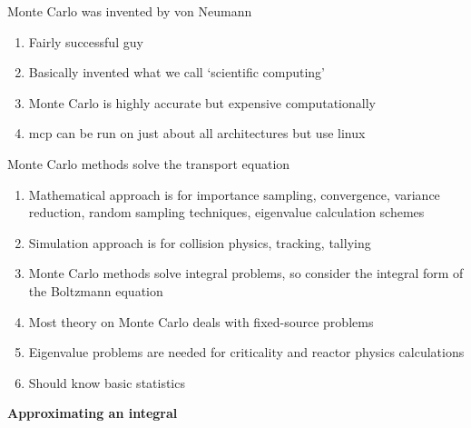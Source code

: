\documentclass[aspectratio=1610,pdftex,dvipsnames,compress,xcolor={dvipsnames}]{beamer}
\newcommand{\acs}{\acrshort} %
\begin{document}
\addtocounter{framenumber}{-1} 
\begin{frame}{Monte Carlo was invented by von Neumann}
    \begin{enumerate}[series=outerlist,topsep=0pt,itemsep=21pt,leftmargin=*,label=(\arabic*)]
        \item[]Fairly successful guy
        \item[]Basically invented what we call `scientific computing'
        \item[]Monte Carlo is highly accurate but expensive computationally
        \item[]\acs{mcp} can be run on just about all architectures but use linux
    \end{enumerate}
\end{frame}


\begin{frame}{Monte Carlo methods solve the transport equation}
    \begin{enumerate}[series=outerlist,topsep=0pt,itemsep=21pt,leftmargin=*,label=(\arabic*)]
        \item[]Mathematical approach is for importance sampling, convergence, variance reduction, random sampling techniques, eigenvalue calculation schemes
        \item[]Simulation approach is for collision physics, tracking, tallying
        \item[]Monte Carlo methods solve integral problems, so consider the integral form of the Boltzmann equation
        \item[]Most theory on Monte Carlo deals with fixed-source problems
        \item[]Eigenvalue problems are needed for criticality and reactor physics calculations
        \item[]Should know basic statistics
    \end{enumerate}
\end{frame}


\begin{frame}[plain]{}
    \centering\LARGE\textbf{Approximating an integral}
\end{frame}
\end{document}
